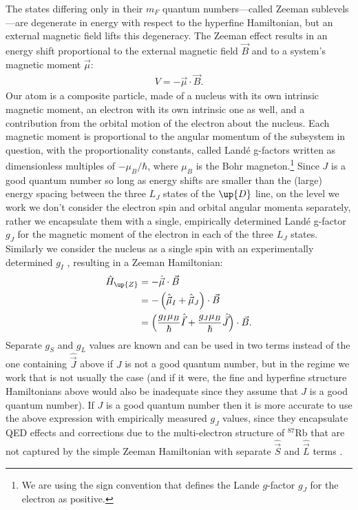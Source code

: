 The states differing only in their $m_F$ quantum numbers---called Zeeman sublevels---are degenerate in energy with respect to the hyperfine Hamiltonian, but an external magnetic field lifts this degeneracy. The Zeeman effect \cite{zeeman_influence_1897, steck_rubidium_2015} results in an energy shift proportional to the external magnetic field $\vec B$ and to a system's magnetic moment $\vec \mu$:
\begin{align}
V = - \vec\mu\cdot\vec B.
\end{align}
Our atom is a composite particle, made of a nucleus with its own intrinsic magnetic moment, an electron with its own intrinsic one as well, and a contribution from the orbital motion of the electron about the nucleus. Each magnetic moment is proportional to the angular momentum of the subsystem in question, with the proportionality constants, called Land\'e g-factors written as dimensionless multiples of $-\mu_B/\hbar$, where $\mu_B$ is the Bohr magneton.\footnote{We are using the sign convention that defines the Lande $g$-factor $g_J$ for the electron as positive.} Since $J$ is a good quantum number so long as energy shifts are smaller than the (large) energy spacing between the three $L_J$ states of the $\up{D}$ line, on the level we work we don't consider the electron spin and orbital angular momenta separately, rather we encapsulate them with a single, empirically determined Land\'e g-factor $g_J$ \cite{steck_rubidium_2015} for the magnetic moment of the electron in each of the three $L_J$ states. Similarly we consider the nucleus as a single spin with an experimentally determined $g_I$ \cite{steck_rubidium_2015}, resulting in a Zeeman Hamiltonian:
\begin{align}
\hat H_\up{Z} & = -\hat{\vec \mu} \cdot \vec B\\
&= -\left(\hat{\vec \mu}_I + \hat{\vec \mu}_J\right) \cdot \vec B\\
&=\left(\frac{g_I\mu_B}{\hbar} \hat{\vec I} + \frac{g_J\mu_B}{\hbar} \hat{\vec J}\right) \cdot \vec B.\label{eq:H_Z}
\end{align}
Separate $g_S$ and $g_L$ values are known and can be used in two terms instead of the one containing $\hat{\vec J}$ above if $J$ is not a good quantum number, but in the regime we work that is not usually the case (and if it were, the fine and hyperfine structure Hamiltonians above would also be inadequate since they assume that $J$ is a good quantum number). If $J$ is a good quantum number then it is more accurate to use the above expression with empirically measured $g_J$ values, since they encapsulate QED effects and corrections due to the multi-electron structure of $^{87}$Rb that are not captured by the simple Zeeman Hamiltonian with separate $\hat{\vec S}$ and $\hat{\vec L}$ terms \cite{steck_rubidium_2015}. 

